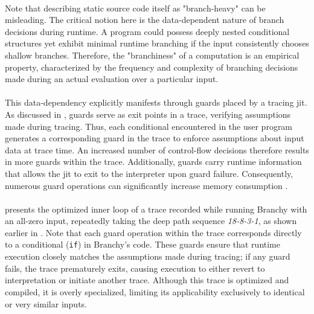 			\paragraph{}%
				Note that describing static source code itself as "branch-heavy" can be misleading. The critical notion here is the data-dependent nature of branch decisions during runtime. A program could possess deeply nested conditional structures yet exhibit minimal runtime branching if the input consistently chooses shallow branches. Therefore, the "branchiness" of a computation is an empirical property, characterized by the frequency and complexity of branching decisions made during an actual evaluation over a particular input.

			\paragraph{}%
				This data-dependency explicitly manifests through guards placed by a tracing \gls{jit}. As discussed in , guards serve as exit points in a trace, verifying assumptions made during tracing. Thus, each conditional encountered in the user program generates a corresponding guard in the trace to enforce assumptions about input data at trace time. An increased number of control-flow decisions therefore results in more guards within the trace. Additionally, guards carry runtime information that allows the \gls{jit} to exit to the interpreter upon guard failure. Consequently, numerous guard operations can significantly increase memory consumption \cite{schneiderEfficientHandlingGuards2012}.


			\vspace{-1em}

			\paragraph{}%
				 presents the optimized inner loop of a trace recorded while running Branchy with an all-zero input, repeatedly taking the deep path sequence \emph{18-8-3-1}, as shown earlier in . Note that each guard operation within the trace corresponds directly to a conditional (\texttt{if}) in Branchy's code. These guards ensure that runtime execution closely matches the assumptions made during tracing; if any guard fails, the trace prematurely exits, causing execution to either revert to interpretation or initiate another trace. Although this trace is optimized and compiled, it is overly specialized, limiting its applicability exclusively to identical or very similar inputs.

